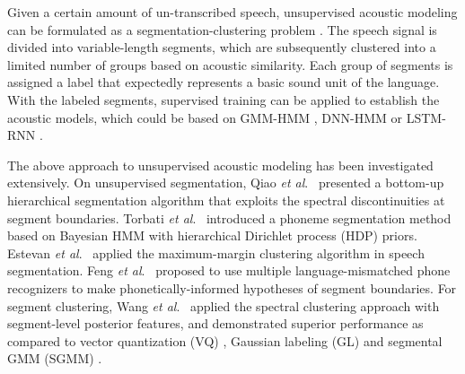 \documentclass[a4paper]{article}
\newcommand{\etal}{\textit{et al}.~}
\begin{document}
Given a certain amount of un-transcribed speech, unsupervised acoustic modeling can be formulated as a segmentation-clustering problem \cite{WangLeeLeungEtAl2014}. The speech signal is divided into variable-length segments, which are subsequently clustered into a limited number of groups based on acoustic similarity. Each group of segments is assigned a label that expectedly represents a basic sound unit of the language. With the labeled segments, supervised training can be applied to establish the acoustic models, which could be based on GMM-HMM \cite{steve1996large}, DNN-HMM \cite{hinton2012deep} or LSTM-RNN \cite{sak2014long}.

The above approach to unsupervised acoustic modeling has been investigated extensively. On unsupervised segmentation, Qiao \etal \cite{QiaoShimomuraMinematsu2008} presented a bottom-up hierarchical segmentation algorithm that exploits the spectral discontinuities at segment boundaries. Torbati \etal \cite{torbati2013speech} introduced a phoneme segmentation method based on Bayesian HMM with hierarchical Dirichlet process (HDP) priors. Estevan \etal \cite{estevan2007finding} applied the maximum-margin clustering algorithm in speech segmentation. Feng \etal \cite{feng2016exploit} proposed to use multiple language-mismatched phone recognizers to make phonetically-informed hypotheses of segment boundaries. For segment clustering, Wang \etal \cite{I3EWang} applied the spectral clustering approach with segment-level posterior features, and demonstrated superior performance as compared to vector quantization (VQ) \cite{LeeSoongJuang}, Gaussian labeling (GL) \cite{WangLeungLeeEtAl2012} and segmental GMM (SGMM) \cite{GishNg1993}.
\end{document}
